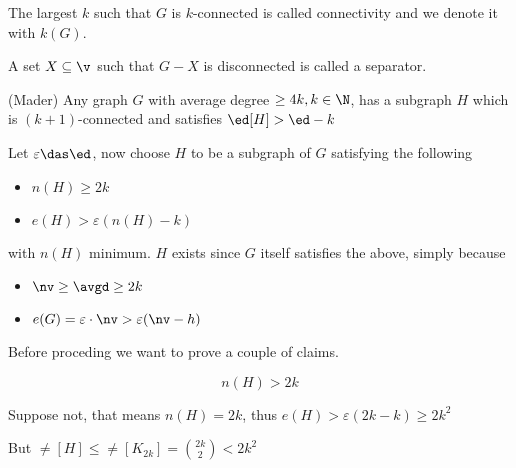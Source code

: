 The largest $k$ such that $G$ is $k$-connected is called connectivity and we denote it with $k(G)$.
\begin{definition}[Separator]
    A set $X \subseteq \v$ such that $G - X$ is disconnected is called a separator.
\end{definition}
\begin{customtheorem}{(Mader)}
    \label{theorem:mader}
    Any graph $G$ with average degree $\geq 4k, k \in \N$, has a subgraph $H$ which is $(k + 1)$-connected and satisfies $\ed[H] > \ed - k$
\end{customtheorem}
\begin{prf}
    Let $\varepsilon \das \ed$, now choose $H$ to be a subgraph of $G$ satisfying the following
    \begin{itemize}
        \item $n(H) \geq 2k$
        \item $e(H) > \varepsilon(n(H) - k)$
    \end{itemize}
    with $n(H)$ minimum. $H$ exists since $G$ itself satisfies the above, simply because
    \begin{itemize}
        \item $\nv \geq \avgd \geq 2k$
        \item $e(G) = \varepsilon \cdot \nv > \varepsilon (\nv - h)$
    \end{itemize}
    Before proceding we want to prove a couple of claims.
    \begin{claim}
        \label{claim:1_Mader}
        \begin{equation*}
            n(H) > 2k
        \end{equation*}
    \end{claim}
    \begin{prf}
        Suppose not, that means $n(H) = 2k$, thus $e(H) > \varepsilon(2k - k) \geq 2k^2$

        But $\ne[H] \leq \ne[K_{2k}] = \binom{2k}{2} < 2k^2$


\end{prf}
\end{prf}
